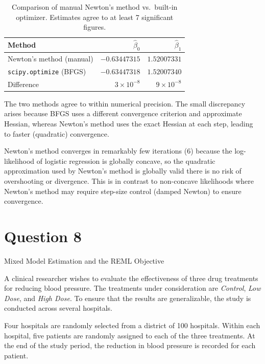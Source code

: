 \documentclass[letterpaper]{article}
\begin{document}
		
		\begin{table}[H]
			\centering
			\begin{tabular}{lrr}
				\toprule
				Method & $\hat{\beta}_0$ & $\hat{\beta}_1$ \\
				\midrule
				Newton's method (manual) & $-0.63447315$ & $1.52007331$ \\
				\texttt{scipy.optimize} (BFGS) & $-0.63447318$ & $1.52007340$ \\
				\midrule
				Difference & $3\times 10^{-8}$ & $9\times 10^{-8}$ \\
				\bottomrule
			\end{tabular}
			\caption{Comparison of manual Newton's method vs.\ built-in optimizer.
				Estimates agree to at least 7 significant figures.}
		\end{table}
		
		The two methods agree to within numerical precision. The small discrepancy
		arises because BFGS uses a different convergence criterion and approximate
		Hessian, whereas Newton's method uses the exact Hessian at each step,
		leading to faster (quadratic) convergence.

		
		Newton's method converges in remarkably few iterations (6) because the
		log-likelihood of logistic regression is globally concave, so the quadratic
		approximation used by Newton's method is globally valid there is no risk
		of overshooting or divergence. This is in contrast to non-concave likelihoods
		where Newton's method may require step-size control (damped Newton) to ensure
		convergence.

	
	\clearpage
	
	\section{Question 8}
	{\color{deepred}  Mixed Model Estimation and the REML Objective}
		
		A clinical researcher wishes to evaluate the effectiveness of three drug treatments for reducing blood pressure. The treatments under consideration are \textit{Control}, \textit{Low Dose}, and \textit{High Dose}. To ensure that the results are generalizable, the study is conducted across several hospitals.
		
		Four hospitals are randomly selected from a district of 100 hospitals. Within each hospital, five patients are randomly assigned to each of the three treatments. At the end of the study period, the reduction in blood pressure is recorded for each patient.
		
\end{document}
